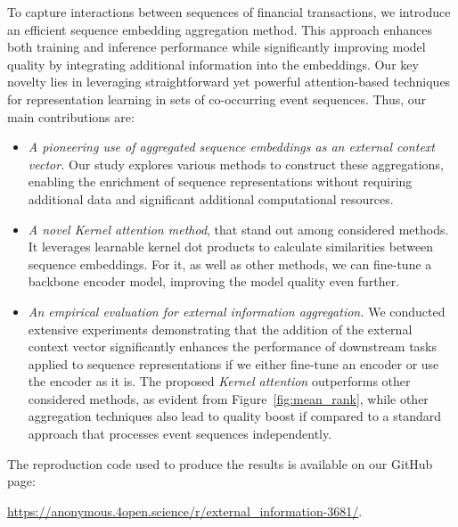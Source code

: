 To capture interactions between sequences of financial transactions, we introduce an efficient sequence embedding aggregation method. This approach enhances both training and inference performance while significantly improving model quality by integrating additional information into the embeddings. Our key novelty lies in leveraging straightforward yet powerful attention-based techniques for representation learning in sets of co-occurring event sequences.
Thus, our main contributions are:
\begin{itemize}
    \item 
    \emph{A pioneering use of aggregated sequence embeddings as an external context vector.} Our study explores various methods to construct these aggregations, enabling the enrichment of sequence representations without requiring additional data and significant additional computational resources.
    \item \emph{A novel Kernel attention method}, that stand out among considered methods. It leverages learnable kernel dot products to calculate similarities between sequence embeddings. For it, as well as other methods, we can fine-tune a backbone encoder model, improving the model quality even further.
    \item \emph{An empirical evaluation for external information aggregation.} We conducted extensive experiments demonstrating that the addition of the external context vector significantly enhances the performance of downstream tasks applied to sequence representations if we either fine-tune an encoder or use the encoder as it is. The proposed \textit{Kernel attention} outperforms other considered methods, as evident from Figure~\ref{fig:mean_rank}, while other aggregation techniques also lead to quality boost if compared to a standard approach that processes event sequences independently.
\end{itemize}

The reproduction code used to produce the results is available on our GitHub page: 

\href{https://anonymous.4open.science/r/external_information-3681/}{https://anonymous.4open.science/r/external\_information-3681/}.


